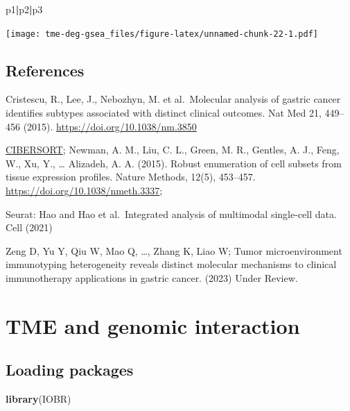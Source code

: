 \documentclass[
  12pt,
]{book}
\newenvironment{Shaded}{\begin{snugshade}}{\end{snugshade}}
\newcommand{\FunctionTok}[1]{\textcolor[rgb]{0.13,0.29,0.53}{\textbf{#1}}}
\newcommand{\NormalTok}[1]{#1}
\newcommand{\SpecialCharTok}[1]{\textcolor[rgb]{0.81,0.36,0.00}{\textbf{#1}}}
\begin{document}
\begin{Shaded}
\begin{Highlighting}[]
\NormalTok{p1}\SpecialCharTok{|}\NormalTok{p2}\SpecialCharTok{|}\NormalTok{p3}
\end{Highlighting}
\end{Shaded}

\texttt{[image: tme-deg-gsea\_files/figure-latex/unnamed-chunk-22-1.pdf]}

\hypertarget{references-4}{%
\section{References}\label{references-4}}

Cristescu, R., Lee, J., Nebozhyn, M. et al.~Molecular analysis of gastric cancer identifies subtypes associated with distinct clinical outcomes. Nat Med 21, 449--456 (2015). \url{https://doi.org/10.1038/nm.3850}

\href{https://cibersort.stanford.edu/}{CIBERSORT}; Newman, A. M., Liu, C. L., Green, M. R., Gentles, A. J., Feng, W., Xu, Y., \ldots{} Alizadeh, A. A. (2015). Robust enumeration of cell subsets from tissue expression profiles. Nature Methods, 12(5), 453--457. \url{https://doi.org/10.1038/nmeth.3337};

Seurat: Hao and Hao et al.~Integrated analysis of multimodal single-cell data. Cell (2021)

Zeng D, Yu Y, Qiu W, Mao Q, \ldots, Zhang K, Liao W; Tumor microenvironment immunotyping heterogeneity reveals distinct molecular mechanisms to clinical immunotherapy applications in gastric cancer. (2023) Under Review.

\hypertarget{tme-and-genomic-interaction}{%
\chapter{\texorpdfstring{\textbf{TME and genomic interaction}}{TME and genomic interaction}}\label{tme-and-genomic-interaction}}

\hypertarget{loading-packages-6}{%
\section{Loading packages}\label{loading-packages-6}}

\begin{Shaded}
\begin{Highlighting}[]
\FunctionTok{library}\NormalTok{(IOBR)}
\end{Highlighting}
\end{Shaded}
\end{document}
